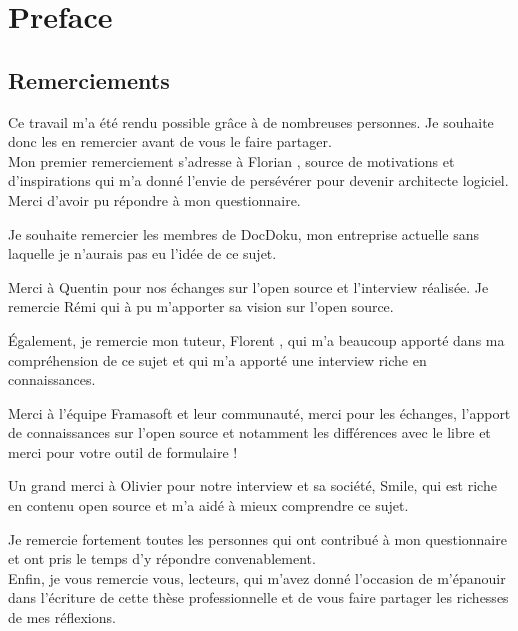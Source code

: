 \chapter*{{Preface}}
	\section*{Remerciements}

	Ce travail m'a été rendu possible grâce à de nombreuses personnes. Je souhaite donc les en remercier avant de vous le faire partager.\\

	Mon premier remerciement s'adresse à Florian , source de motivations et d'inspirations qui m'a donné l'envie de persévérer pour devenir architecte logiciel. Merci d'avoir pu répondre à mon questionnaire.

	Je souhaite remercier les membres de DocDoku, mon entreprise actuelle sans laquelle je n'aurais pas eu l'idée de ce sujet.

	Merci à Quentin  pour nos échanges sur l'open source et l'interview réalisée.
	Je remercie Rémi  qui à pu m'apporter sa vision sur l'open source.

	Également, je remercie mon tuteur, Florent , qui m'a beaucoup apporté dans ma compréhension de ce sujet et qui m'a apporté une interview riche en connaissances.

	Merci à l'équipe Framasoft et leur communauté, merci pour les échanges, l'apport de connaissances sur l'open source et notamment les différences avec le libre et merci pour votre outil de formulaire !

	Un grand merci à Olivier  pour notre interview et sa société, Smile, qui est riche en contenu open source et m'a aidé à mieux comprendre ce sujet.

	Je remercie fortement toutes les personnes qui ont contribué à mon questionnaire et ont pris le temps d'y répondre convenablement.\\

	Enfin, je vous remercie vous, lecteurs, qui m'avez donné l'occasion de m'épanouir dans l'écriture de cette thèse professionnelle et de vous faire partager les richesses de mes réflexions.


